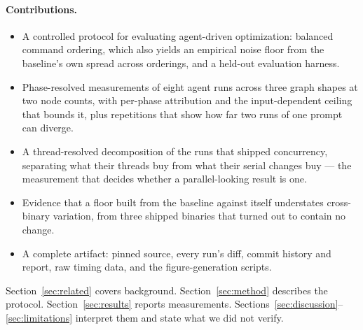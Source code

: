\paragraph{Contributions.}
\begin{itemize}
\item A controlled protocol for evaluating agent-driven optimization: balanced
      command ordering, which also yields an empirical noise floor from the
      baseline's own spread across orderings, and a held-out evaluation
      harness.
\item Phase-resolved measurements of eight agent runs across three graph shapes
      at two node counts, with per-phase attribution and the input-dependent
      ceiling that bounds it, plus repetitions that show how far two runs of one
      prompt can diverge.
\item A thread-resolved decomposition of the runs that shipped concurrency,
      separating what their threads buy from what their serial changes buy ---
      the measurement that decides whether a parallel-looking result is one.
\item Evidence that a floor built from the baseline against itself understates
      cross-binary variation, from three shipped binaries that turned out to
      contain no change.
\item A complete artifact: pinned source, every run's diff, commit history and
      report, raw timing data, and the figure-generation scripts.
\end{itemize}

Section~\ref{sec:related} covers background. Section~\ref{sec:method} describes
the protocol. Section~\ref{sec:results} reports
measurements. Sections~\ref{sec:discussion}--\ref{sec:limitations} interpret
them and state what we did not verify.
